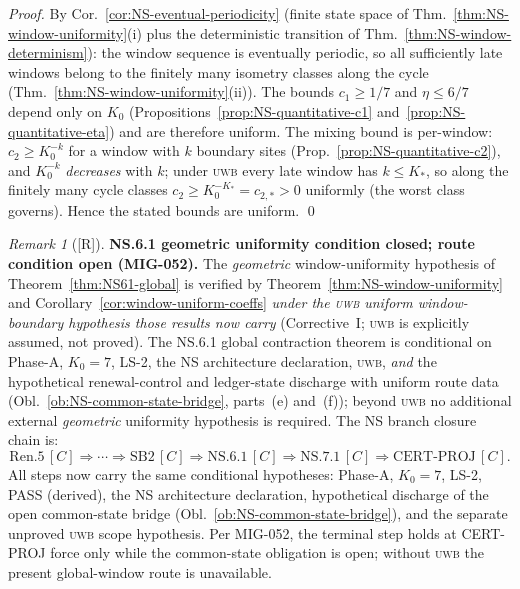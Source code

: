 \documentclass[12pt,oneside]{amsbook}
\theoremstyle{plain}
\theoremstyle{definition}
\theoremstyle{remark}
\newtheorem{remark}[theorem]{Remark}
\newcommand{\status}[1]{\textup{[#1]}}
\begin{document}
\begin{proof}
By Cor.~\ref{cor:NS-eventual-periodicity} (finite state space of
Thm.~\ref{thm:NS-window-uniformity}(i) plus the deterministic
transition of Thm.~\ref{thm:NS-window-determinism}): the window
sequence is eventually periodic, so all sufficiently late windows
belong to the finitely many isometry classes along the cycle
(Thm.~\ref{thm:NS-window-uniformity}(ii)). The bounds
$c_1 \geq 1/7$ and $\eta \leq 6/7$ depend only on $K_0$
(Propositions~\ref{prop:NS-quantitative-c1}
and~\ref{prop:NS-quantitative-eta}) and are therefore uniform.
The mixing bound is per-window:
$c_2 \geq K_0^{-k}$ for a window with $k$ boundary sites
(Prop.~\ref{prop:NS-quantitative-c2}), and $K_0^{-k}$
\emph{decreases} with $k$; under \textsc{uwb} every late window
has $k \leq K_*$, so along the finitely many cycle classes
$c_2 \geq K_0^{-K_*} = c_{2,*} > 0$ uniformly (the worst class
governs). Hence the stated bounds are uniform. \qed
\end{proof}

\begin{remark}[\status{R}]
\textbf{NS.6.1 geometric uniformity condition closed; route
condition open (MIG-052).}
The \emph{geometric} window-uniformity hypothesis of
Theorem~\ref{thm:NS61-global} is verified by
Theorem~\ref{thm:NS-window-uniformity} and
Corollary~\ref{cor:window-uniform-coeffs} \emph{under the
\textsc{uwb} uniform window-boundary hypothesis those results now
carry} (Corrective~I; \textsc{uwb} is explicitly assumed, not
proved). The NS.6.1 global contraction theorem is conditional on
Phase-A, $K_0=7$, LS-2, the NS architecture declaration,
\textsc{uwb}, \emph{and} the hypothetical renewal-control and
ledger-state discharge with uniform route data
(Obl.~\ref{ob:NS-common-state-bridge}, parts~(e) and~(f)); beyond
\textsc{uwb} no additional external \emph{geometric} uniformity
hypothesis is required.
The NS branch closure chain is:
\[
 \mathrm{Ren.5}\,[C] \Rightarrow \cdots \Rightarrow
 \mathrm{SB2}\,[C] \Rightarrow \mathrm{NS.6.1}\,[C]
 \Rightarrow \mathrm{NS.7.1}\,[C]
 \Rightarrow \text{CERT-PROJ}\,[C].
\]
All steps now carry the same conditional hypotheses:
Phase-A, $K_0=7$, LS-2, PASS (derived), the NS architecture
declaration, hypothetical discharge of the open common-state bridge
(Obl.~\ref{ob:NS-common-state-bridge}), and the separate unproved
\textsc{uwb} scope hypothesis. Per MIG-052, the terminal step holds
at CERT-PROJ force only while the common-state obligation is open;
without \textsc{uwb} the present global-window route is unavailable.
\end{remark}
\end{document}
